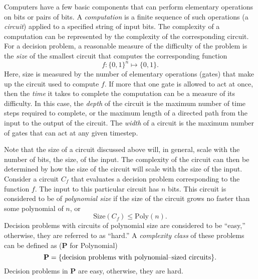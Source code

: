 Computers have a few basic components that can perform elementary 
operations on bits or pairs of bits.  A {\sl computation} is a 
finite sequence of such operations (a \emph{circuit}) applied to a 
specified string of input bits.
The complexity of a computation can be represented by 
the complexity of the corresponding circuit.
For a decision problem, a reasonable measure of the difficulty
of the problem is the \emph{size} of the smallest circuit that
computes the corresponding function 
\begin{equation}    
f\colon\lbrace 0,1\rbrace^n \mapsto \lbrace 0,1\rbrace.
\end{equation}
Here, size is measured by the number of elementary operations 
(gates) that make up the circuit used to compute $f$.
If more that one gate is allowed to act at once, then the
\emph{time} it takes to complete the computation can be a measure
of its difficulty.  In this case, the \emph{depth} of the circuit
is the maximum number of time steps required to complete, or the 
maximum length of a directed path from the input to the output of
the circuit.  The \emph{width} of a circuit is the maximum number of
gates that can act at any given timestep.

Note that the size of a circuit discussed above
will, in general, scale with the number of bits, the size, of the input.  
The complexity of the circuit can then be determined by how 
the size of the circuit will scale with the size of the input.
Consider a circuit $C_f$ that evaluates a decision problem
corresponding to the function $f$.  The input to this particular
circuit has $n$ bits.  This circuit is considered to be of
\emph{polynomial size} if the size of the circuit grows no faster
than some polynomial of $n$, or
\begin{equation}
\text{Size}\left( C_f \right) \le \text{Poly}(n).
\end{equation}
Decision problems with circuits of polynomial size are considered
to be ``easy,'' otherwise, they are referred to as ``hard.''
A \emph{complexity class} of these problems 
can be defined as ({\bf P} for Polynomial)
\begin{equation}
{\bf P} = \lbrace\text{decision problems with polynomial--sized circuits}
          \rbrace.
\end{equation}
Decision problems in {\bf P} are easy, otherwise, they are hard.


